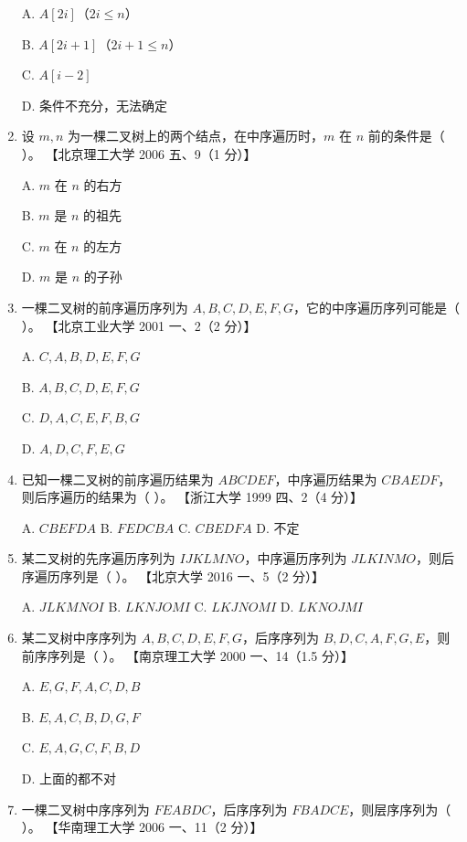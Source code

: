 \documentclass[lang=cn,newtx,10pt,scheme=chinese]{elegantbook}
\begin{document}
\begin{enumerate}
    A. $A[2i]$（$2i ≤ n$）  

    B. $A[2i+1]$（$2i+1 ≤ n$） 

    C. $A[i-2]$  

    D. 条件不充分，无法确定  

    \item 设 $m, n$ 为一棵二叉树上的两个结点，在中序遍历时，$m$ 在 $n$ 前的条件是（ ）。  
    【北京理工大学 2006 五、9（1 分）】  

    A. $m$ 在 $n$ 的右方 

    B. $m$ 是 $n$ 的祖先  

    C. $m$ 在 $n$ 的左方  

    D. $m$ 是 $n$ 的子孙  

    \item 一棵二叉树的前序遍历序列为 $A, B, C, D, E, F, G$，它的中序遍历序列可能是（ ）。  
    【北京工业大学 2001 一、2（2 分）】 

    A. $C, A, B, D, E, F, G$  

    B. $A, B, C, D, E, F, G$  

    C. $D, A, C, E, F, B, G$  

    D. $A, D, C, F, E, G$  

    \item 已知一棵二叉树的前序遍历结果为 $ABCDEF$，中序遍历结果为 $CBAEDF$，则后序遍历的结果为（ ）。  
    【浙江大学 1999 四、2（4 分）】  

    A. $ CBEFDA$ \quad B. $FEDCBA $ \quad C. $CBEDFA $ \quad D. 不定  

    \item 某二叉树的先序遍历序列为 $IJKLMNO$，中序遍历序列为 $JLKINMO$，则后序遍历序列是（ ）。  
    【北京大学 2016 一、5（2 分）】  

    A. $JLKMNOI$ \quad B. $LKNJOMI$ \quad C. $LKJNOMI$ \quad D. $LKNOJMI$  

    \item 某二叉树中序序列为 $A, B, C, D, E, F,G$，后序序列为 $B, D, C, A,F, G, E$，则前序序列是（ ）。  
    【南京理工大学 2000 一、14（1.5 分）】  

    A. $E, G, F, A, C, D,B$  

    B. $E,A,C,B,D,G,F$  

    C. $E,A,G,C,F,B,D$  

    D. 上面的都不对  

    \item 一棵二叉树中序序列为 $FEABDC$，后序序列为 $FBADCE$，则层序序列为（ ）。  
    【华南理工大学 2006 一、11（2 分）】  


\end{enumerate}
\end{document}
